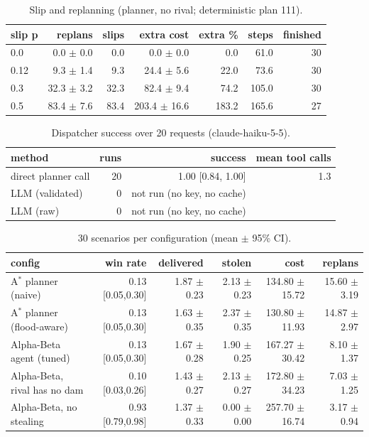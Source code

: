 \begin{table}[t]
\centering
\footnotesize
\caption{Slip and replanning (planner, no rival; deterministic plan 111).}
\label{tab:slip}
\setlength{\tabcolsep}{3pt}
\begin{tabular}{lrrrrrr}
\toprule
slip p & replans & slips & extra cost & extra \% & steps & finished \\
\midrule
0.0 & 0.0 $\pm$ 0.0 & 0.0 & 0.0 $\pm$ 0.0 & 0.0 & 61.0 & 30 \\
0.12 & 9.3 $\pm$ 1.4 & 9.3 & 24.4 $\pm$ 5.6 & 22.0 & 73.6 & 30 \\
0.3 & 32.3 $\pm$ 3.2 & 32.3 & 82.4 $\pm$ 9.4 & 74.2 & 105.0 & 30 \\
0.5 & 83.4 $\pm$ 7.6 & 83.4 & 203.4 $\pm$ 16.6 & 183.2 & 165.6 & 27 \\
\bottomrule
\end{tabular}
\end{table}

\begin{table}[t]
\centering
\footnotesize
\caption{Dispatcher success over 20 requests (claude-haiku-5-5).}
\label{tab:llm}
\setlength{\tabcolsep}{3pt}
\begin{tabular}{lrrr}
\toprule
method & runs & success & mean tool calls \\
\midrule
direct planner call & 20 & 1.00 [0.84, 1.00] & 1.3 \\
LLM (validated) & 0 & not run (no key, no cache) &  \\
LLM (raw) & 0 & not run (no key, no cache) &  \\
\bottomrule
\end{tabular}
\end{table}

\begin{table}[t]
\centering
\footnotesize
\caption{30 scenarios per configuration (mean $\pm$ 95\% CI).}
\label{tab:configs}
\setlength{\tabcolsep}{3pt}
\begin{tabular}{lrrrrr}
\toprule
config & win rate & delivered & stolen & cost & replans \\
\midrule
A$^*$ planner (naive) & 0.13 [0.05,0.30] & 1.87 $\pm$ 0.23 & 2.13 $\pm$ 0.23 & 134.80 $\pm$ 15.72 & 15.60 $\pm$ 3.19 \\
A$^*$ planner (flood-aware) & 0.13 [0.05,0.30] & 1.63 $\pm$ 0.35 & 2.37 $\pm$ 0.35 & 130.80 $\pm$ 11.93 & 14.87 $\pm$ 2.97 \\
Alpha-Beta agent (tuned) & 0.13 [0.05,0.30] & 1.67 $\pm$ 0.28 & 1.90 $\pm$ 0.25 & 167.27 $\pm$ 30.42 & 8.10 $\pm$ 1.37 \\
Alpha-Beta, rival has no dam & 0.10 [0.03,0.26] & 1.43 $\pm$ 0.27 & 2.13 $\pm$ 0.27 & 172.80 $\pm$ 34.23 & 7.03 $\pm$ 1.25 \\
Alpha-Beta, no stealing & 0.93 [0.79,0.98] & 1.37 $\pm$ 0.33 & 0.00 $\pm$ 0.00 & 257.70 $\pm$ 16.74 & 3.17 $\pm$ 0.94 \\
\bottomrule
\end{tabular}
\end{table}

